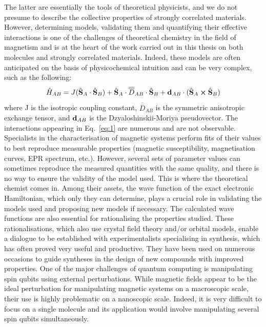 \documentclass[12pt,a4paper]{report}
\numberwithin{equation}{section}
\begin{document}
The latter are essentially the tools of theoretical physicists, and we do not presume to describe the collective properties of strongly correlated materials.
However, determining models, validating them and quantifying their effective interactions is one of the challenges of theoretical chemistry in the field of magnetism and is at the heart of the work carried out in this thesis on both molecules and strongly correlated materials.
Indeed, these models are often anticipated on the basis of physicochemical intuition and can be very complex, such as the following:
\begin{equation}\label{eq:1}
    \hat{H}_{AB}=J(\hat{\vb S}_A \cdot \hat{\vb S}_B) + \hat{\vb S}_A \cdot\overline{\overline{D}}_{AB} \cdot \hat{\vb S}_B + \vb{d}_{AB} \cdot (\hat{\vb S}_A \cross \hat{\vb S}_B)
\end{equation}
where J is the isotropic coupling constant, $\overline{\overline{D}}_{AB}$ is the symmetric anisotropic exchange tensor, and $\vb{d}_{AB}$ is the Dzyaloshinskii-Moriya pseudovector.
The interactions appearing in Eq.~\ref{eq:1} are numerous and are not observable.
Specialists in the characterisation of magnetic systems perform fits of their values to best reproduce measurable properties (magnetic susceptibility, magnetisation curves, EPR spectrum, etc.).
However, several sets of parameter values can sometimes reproduce the measured quantities with the same quality, and there is no way to ensure the validity of the model used.
This is where the theoretical chemist comes in.
Among their assets, the wave function of the exact electronic Hamiltonian, which only they can determine, plays a crucial role in validating the models used and proposing new models if necessary.
The calculated wave functions are also essential for rationalising the properties studied.
These rationalisations, which also use crystal field theory and/or orbital models, enable a dialogue to be established with experimentalists specialising in synthesis, which has often proved very useful and productive.
They have been used on numerous occasions to guide syntheses in the design of new compounds with improved properties. 
One of the major challenges of quantum computing is manipulating spin qubits using external perturbations.
While magnetic fields appear to be the ideal perturbation for manipulating magnetic systems on a macroscopic scale, their use is highly problematic on a nanoscopic scale.
Indeed, it is very difficult to focus on a single molecule and its application would involve manipulating several spin qubits simultaneously.
\end{document}
